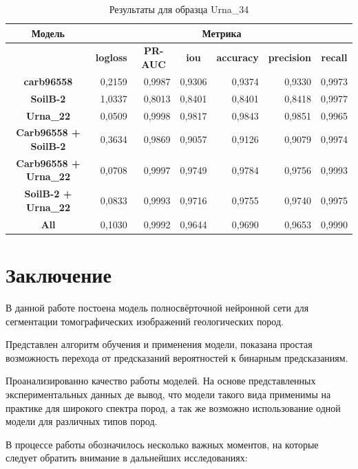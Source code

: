 \documentclass[14pt, a4paper, oneside, bold]{extarticle}
\begin{document}
\begin{table}[htbp]
\small
\begin{tabular}{|c|r|r|r|r|r|r|}
\hline
\textbf{Модель} & \multicolumn{ 6}{c|}{\textbf{Метрика}} \\ \hline
\textbf{} & \multicolumn{1}{c|}{\textbf{logloss}} & \multicolumn{1}{c|}{\textbf{PR-AUC}} & \multicolumn{1}{c|}{\textbf{iou}} & \multicolumn{1}{c|}{\textbf{accuracy}} & \multicolumn{1}{c|}{\textbf{precision}} & \multicolumn{1}{c|}{\textbf{recall}} \\ \hline
\textbf{carb96558} & 0,2159 & 0,9987 & 0,9306 & 0,9374 & 0,9330 & 0,9973 \\ \hline
\textbf{SoilB-2} & 1,0337 & 0,8013 & 0,8401 & 0,8401 & 0,8418 & 0,9977 \\ \hline
\textbf{Urna\_22} & 0,0509 & 0,9998 & 0,9817 & 0,9843 & 0,9851 & 0,9965 \\ \hline
\textbf{Carb96558 + SoilB-2} & 0,3634 & 0,9869 & 0,9057 & 0,9126 & 0,9079 & 0,9974 \\ \hline
\textbf{Carb96558 + Urna\_22} & 0,0708 & 0,9997 & 0,9749 & 0,9784 & 0,9756 & 0,9993 \\ \hline
\textbf{SoilB-2 + Urna\_22} & 0,0833 & 0,9993 & 0,9716 & 0,9755 & 0,9740 & 0,9975 \\ \hline
\textbf{All} & 0,1030 & 0,9992 & 0,9644 & 0,9690 & 0,9653 & 0,9990 \\ \hline
\end{tabular}
\caption{Результаты для образца Urna\_34}
\label{Urna_34}
\end{table}

\newpage


\section{Заключение}

В данной работе постоена модель полносвёрточной нейронной сети для сегментации томографических изображений геологических пород.

Представлен алгоритм обучения и применения модели, показана простая возможность перехода от предсказаний вероятностей к бинарным предсказаниям. 

Проанализированно качество работы моделей. На основе представленных  экспериментальных данных де вывод, что модели такого вида применимы на практике для широкого спектра пород, а так же возможно использование одной модели для различных типов пород.

В процессе работы обозначилось несколько важных моментов, на которые следует обратить внимание в дальнейших исследованиях:
\end{document}
